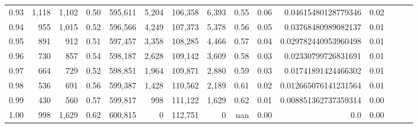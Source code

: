 \begin{tabular}{rrrrrrrrrrrrrrr}
0.93 &   1,118 &  1,102 &  0.50 &  595,611 &    5,204 &  106,358 &    6,393 &  0.55 &  0.06 &   0.04615480128779346 &      0.02 \\
0.94 &     955 &  1,015 &  0.52 &  596,566 &    4,249 &  107,373 &    5,378 &  0.56 &  0.05 &   0.03768480989082137 &      0.01 \\
0.95 &     891 &    912 &  0.51 &  597,457 &    3,358 &  108,285 &    4,466 &  0.57 &  0.04 &  0.029782440953960498 &      0.01 \\
0.96 &     730 &    857 &  0.54 &  598,187 &    2,628 &  109,142 &    3,609 &  0.58 &  0.03 &   0.02330799726831691 &      0.01 \\
0.97 &     664 &    729 &  0.52 &  598,851 &    1,964 &  109,871 &    2,880 &  0.59 &  0.03 &   0.01741891424466302 &      0.01 \\
0.98 &     536 &    691 &  0.56 &  599,387 &    1,428 &  110,562 &    2,189 &  0.61 &  0.02 &  0.012665076141231564 &      0.01 \\
0.99 &     430 &    560 &  0.57 &  599,817 &      998 &  111,122 &    1,629 &  0.62 &  0.01 &  0.008851362737359314 &      0.00 \\
1.00 &     998 &  1,629 &  0.62 &  600,815 &        0 &  112,751 &        0 &   nan &  0.00 &                   0.0 &      0.00 \\
\bottomrule
\end{tabular}
